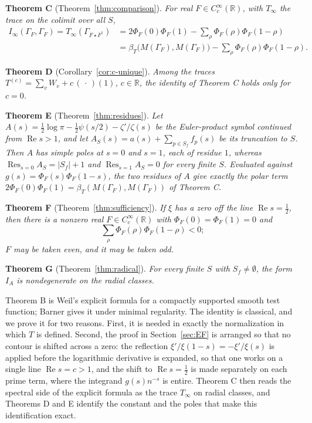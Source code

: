 \documentclass[11pt]{amsart}
\theoremstyle{definition}
\theoremstyle{remark}
\newcommand{\R}{\mathbb R}
\newcommand{\Rel}{\operatorname{Re}}
\newcommand{\Res}{\operatorname*{Res}}
\begin{document}
\medskip
\noindent\textbf{Theorem C} (Theorem~\ref{thm:comparison}).
\emph{For real $F\in C_c^\infty(\R)$, with $T_\infty$ the trace on the
colimit over all $S$,}
\[
\begin{aligned}
  I_\infty(\Gamma_F,\Gamma_F)=T_\infty(\Gamma_{F\star F^\dagger})
  &=2\Phi_F(0)\Phi_F(1)-\sum_\rho\Phi_F(\rho)\Phi_F(1-\rho)\\
  &=\beta_T\bigl(M(\Gamma_F),M(\Gamma_F)\bigr)
     -\sum_\rho\Phi_F(\rho)\Phi_F(1-\rho).
\end{aligned}
\]

\medskip
\noindent\textbf{Theorem D} (Corollary~\ref{cor:c-unique}).
\emph{Among the traces $T^{(c)}=\sum_v W_v+c\,(\,\cdot\,)(1)$, $c\in\R$, the
identity of Theorem C holds only for $c=0$.}

\medskip
\noindent\textbf{Theorem E} (Theorem~\ref{thm:residues}).
\emph{Let $A(s)=\tfrac12\log\pi-\tfrac12\psi(s/2)-\zeta'/\zeta(s)$ be the
Euler-product symbol continued from $\Rel s>1$, and let
$A_S(s)=a(s)+\sum_{p\in S_f}f_p(s)$ be its truncation to $S$.  Then $A$ has
simple poles at $s=0$ and $s=1$, each of residue $1$, whereas
$\Res_{s=0}A_S=|S_f|+1$ and $\Res_{s=1}A_S=0$ for every finite $S$.
Evaluated against $g(s)=\Phi_F(s)\Phi_F(1-s)$, the two residues of $A$ give
exactly the polar term $2\Phi_F(0)\Phi_F(1)=\beta_T(M(\Gamma_F),M(\Gamma_F))$
of Theorem C.}

\medskip
\noindent\textbf{Theorem F} (Theorem~\ref{thm:sufficiency}).
\emph{If $\xi$ has a zero off the line $\Rel s=\tfrac12$, then there is a
nonzero real $F\in C_c^\infty(\R)$ with $\Phi_F(0)=\Phi_F(1)=0$ and}
\[
  \sum_\rho\Phi_F(\rho)\Phi_F(1-\rho)<0 ;
\]
\emph{$F$ may be taken even, and it may be taken odd.}

\medskip
\noindent\textbf{Theorem G} (Theorem~\ref{thm:radical}).
\emph{For every finite $S$ with $S_f\ne\emptyset$, the form $I_A$ is
nondegenerate on the radial classes.}

\medskip
Theorem B is Weil's explicit formula \cite{Weil1952} for a compactly
supported smooth test function; Barner \cite{Barner1981} gives it under
minimal regularity.  The identity is classical, and we prove it for two
reasons.  First, it is needed in exactly the normalization in which $T$ is
defined.  Second, the proof in Section~\ref{sec:EF} is arranged so that no
contour is shifted across a zero: the reflection $\xi'/\xi(1-s)=-\xi'/\xi(s)$
is applied before the logarithmic derivative is expanded, so that one works on
a single line $\Rel s=c>1$, and the shift to $\Rel s=\tfrac12$ is made
separately on each prime term, where the integrand $g(s)n^{-s}$ is entire.
Theorem C then reads the spectral side of the explicit formula as the trace
$T_\infty$ on radial classes, and Theorems D and E identify the constant and
the poles that make this identification exact.
\end{document}
